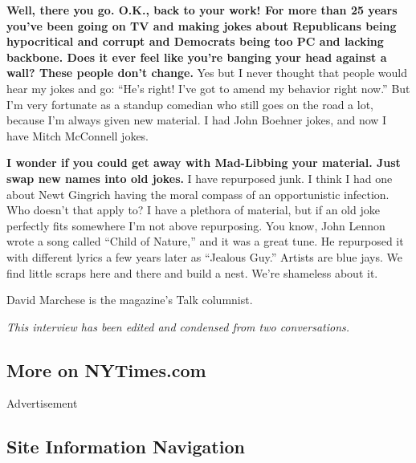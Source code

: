 \textbf{Well, there you go. O.K., back to your work! For more than 25
years you've been going on TV and making jokes about Republicans being
hypocritical and corrupt and Democrats being too PC and lacking
backbone. Does it ever feel like you're banging your head against a
wall? These people don't change.} Yes but I never thought that people
would hear my jokes and go: ``He's right! I've got to amend my behavior
right now.'' But I'm very fortunate as a standup comedian who still goes
on the road a lot, because I'm always given new material. I had John
Boehner jokes, and now I have Mitch McConnell jokes.

\textbf{I wonder if you could get away with Mad-Libbing your material.
Just swap new names into old jokes.} I have repurposed junk. I think I
had one about Newt Gingrich having the moral compass of an opportunistic
infection. Who doesn't that apply to? I have a plethora of material, but
if an old joke perfectly fits somewhere I'm not above repurposing. You
know, John Lennon wrote a song called ``Child of Nature,'' and it was a
great tune. He repurposed it with different lyrics a few years later as
``Jealous Guy.'' Artists are blue jays. We find little scraps here and
there and build a nest. We're shameless about it.

David Marchese is the magazine's Talk columnist.

\emph{This interview has been edited and condensed from two
conversations.}

\hypertarget{more-on-nytimescom}{%
\subsection{More on NYTimes.com}\label{more-on-nytimescom}}

Advertisement

\hypertarget{site-information-navigation}{%
\subsection{Site Information
Navigation}\label{site-information-navigation}}

